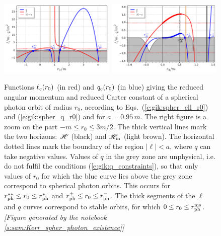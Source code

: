 \begin{figure}
\centerline{\includegraphics[width=0.49\textwidth]{gik_spher_orb_exist.pdf}\
\includegraphics[width=0.49\textwidth]{gik_spher_orb_exist_zoom.pdf}}
\caption[]{\label{f:gik:spher_orb_exist} \footnotesize
Functions $\ell_{\rm c}(r_0)$ (in red) and $q_{\rm c}(r_0)$ (in blue) giving the reduced angular momentum
and reduced Carter constant of a spherical photon orbit of radius $r_0$,
according to Eqs.~(\ref{e:gik:spher_ell_r0}) and (\ref{e:gik:spher_q_r0})
and for $a=0.95\, m$. The right figure is a zoom on the part
$-m\leq r_0 \leq 3m/2$. The thick vertical lines
mark the two horizons: $\mathscr{H}$ (black) and $\mathscr{H}_{\rm in}$ (light brown).
The horizontal dotted lines mark the boundary of the region $|\ell|<a$,
where $q$ can take negative values. Values of $q$ in the grey zone
are unphysical, i.e. do not fulfil the conditions (\ref{e:gik:q_constraints}),
so that only values of $r_0$ for which the blue curve lies
above the grey zone correspond to spherical photon orbits. This occurs
for $r_{\rm ph}^{**} \leq r_0 \leq r_{\rm ph}^*$ and $r_{\rm ph}^+ \leq r_0 \leq r_{\rm ph}^-$.
The thick segments of the $\ell$ and $q$ curves correspond to stable orbits, for
which $0\leq r_0\leq r_{\rm ph}^{\rm ms}$.
\textsl{[Figure generated by the notebook \ref{s:sam:Kerr_spher_photon_existence}]}
}
\end{figure}

